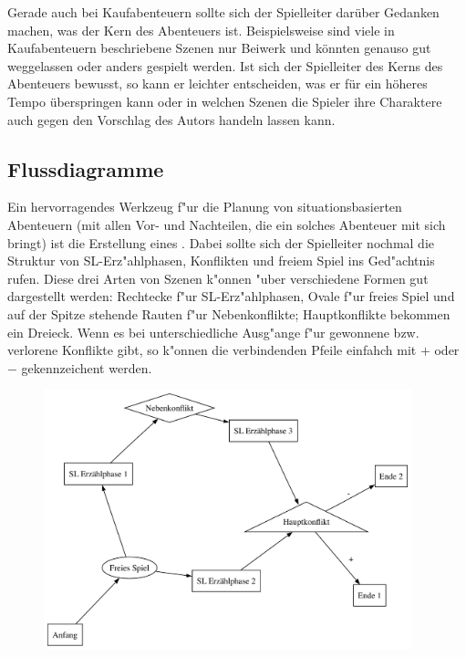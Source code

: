 Gerade auch bei Kaufabenteuern sollte sich der Spielleiter darüber Gedanken machen, was der Kern des Abenteuers ist. Beispielsweise sind viele in Kaufabenteuern beschriebene Szenen nur Beiwerk und könnten genauso gut weggelassen oder anders gespielt werden. Ist sich der Spielleiter des Kerns des Abenteuers bewusst, so kann er leichter entscheiden, was er für ein höheres Tempo überspringen kann oder in welchen Szenen die Spieler ihre Charaktere auch gegen den Vorschlag des Autors handeln lassen kann. 



\subsection{Flussdiagramme}
Ein hervorragendes Werkzeug f"ur die Planung von situationsbasierten Abenteuern (mit allen Vor- und Nachteilen, die ein solches Abenteuer mit sich bringt) ist die Erstellung eines . Dabei sollte sich der Spielleiter nochmal die Struktur von SL-Erz"ahlphasen, Konflikten und freiem Spiel ins Ged"achtnis rufen. Diese drei Arten von Szenen k"onnen "uber verschiedene Formen gut dargestellt werden: Rechtecke f"ur SL-Erz"ahlphasen, Ovale f"ur freies Spiel und auf der Spitze stehende Rauten f"ur Nebenkonflikte; Hauptkonflikte bekommen ein Dreieck. Wenn es bei unterschiedliche Ausg"ange f"ur gewonnene bzw. verlorene Konflikte gibt, so k"onnen die verbindenden Pfeile einfahch mit $+$ oder $-$ gekennzeichent werden.

\begin{figure}
\centerline{\includegraphics[width=0.95\textwidth]{pics/fluss1}}
\end{figure}

